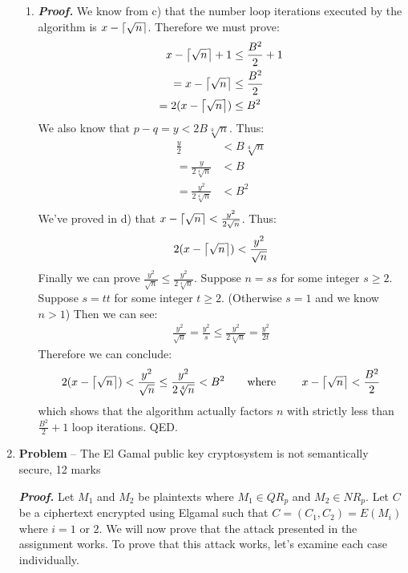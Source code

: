 \documentclass[11pt]{article}
\DeclarePairedDelimiter{\ceil}{\lceil}{\rceil}
\theoremstyle{definition}
\newcounter{problem}
\begin{document}
\begin{enumerate}
\begin{enumerate}
\item  %
\textbf{\emph{Proof.}} We know from c) that the number loop iterations executed by the algorithm is $x - \ceil*{\sqrt{n}}$. Therefore we must prove:
\begin{align*}
x - \ceil*{\sqrt{n}} + 1 &\leq \frac{B^2}{2} + 1 \\
= x - \ceil*{\sqrt{n}} &\leq \frac{B^2}{2} \\
= 2(x - \ceil*{\sqrt{n}}) &\leq B^2 \\
\end{align*} 
We also know that $p - q = y < 2B\sqrt[4]{n}$. Thus:
\begin{align*}
\frac{y}{2} &< B\sqrt[4]{n} \\
= \frac{y}{2\sqrt[4]{n}} &< B \\
= \frac{y^2}{2\sqrt[4]{n}} &< B^2 \\
\end{align*}
We’ve proved in d) that $x - \ceil*{\sqrt{n}} <  \frac{y^2}{2\sqrt{n}}$. Thus:
\begin{align*}	
2(x - \ceil*{\sqrt{n}}) < \frac{y^2}{\sqrt{n}}
\end{align*}
Finally we can prove $\frac{y^2}{\sqrt{n}} \leq \frac{y^2}{2\sqrt[4]{n}}$. Suppose $n = ss$ for some integer $s \geq 2$. Suppose $s = tt$ for some integer $t \geq 2$. (Otherwise $s = 1$ and we know $n > 1$) Then we can see:
\begin{align*}
\frac{y^2}{\sqrt{n}} = \frac{y^2}{s} \leq \frac{y^2}{2\sqrt[4]{n}} = \frac{y^2}{2t}
\end{align*}
Therefore we can conclude:
\begin{align*}
2(x - \ceil*{\sqrt{n}}) < \frac{y^2}{\sqrt{n}} \leq \frac{y^2}{2\sqrt[4]{n}} < B^2 \text{\qquad where \qquad} x - \ceil*{\sqrt{n}} < \frac{B^2}{2} 
\end{align*}
which shows that the algorithm actually factors $n$ with strictly less than $\frac{B^2}{2} + 1$ loop iterations. 
QED.


\end{enumerate}

\newpage

\item[] \textbf{Problem \theproblem} -- The El Gamal public key cryptosystem is not
    semantically secure, 12 marks

\textbf{\emph{Proof.}} Let $M_1$ and $M_2$ be plaintexts where $M_1 \in QR_p$ and $M_2 \in NR_p$. Let $C$ be a ciphertext encrypted using Elgamal such that $C = (C_1, C_2) = E(M_i)$ where $i = 1$ or $2$. We will now prove that the attack presented in the assignment works. To prove that this attack works, let’s examine each case individually. 


\end{enumerate}
\end{document}
